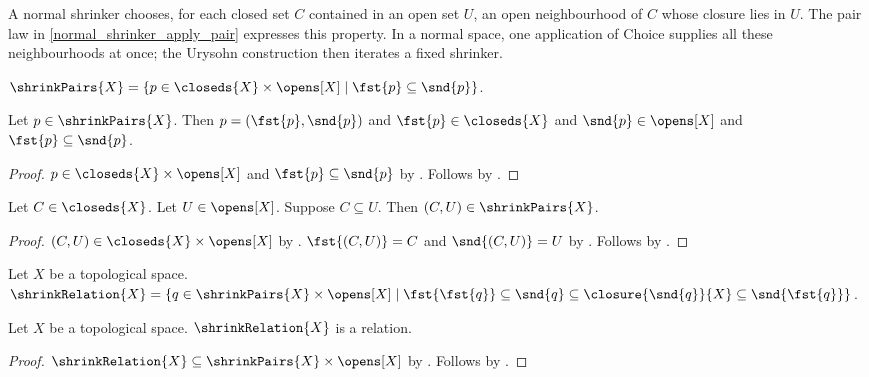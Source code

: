 A normal shrinker chooses, for each closed set $C$ contained in an open set
$U$, an open neighbourhood of $C$ whose closure lies in $U$.
The pair law in \ref{normal_shrinker_apply_pair} expresses this property.
In a normal space, one application of Choice supplies all these neighbourhoods
at once; the Urysohn construction then iterates a fixed shrinker.

\begin{definition}\label{shrink_pairs}
    $\shrinkPairs{X}=\{p\in\closeds{X}\times\opens[X]\mid
        \fst{p}\subseteq\snd{p}\}$.
\end{definition}

\begin{proposition}\label{shrink_pair_elim}
    Let $p\in\shrinkPairs{X}$.
    Then $p=(\fst{p},\snd{p})$ and
        $\fst{p}\in\closeds{X}$ and $\snd{p}\in\opens[X]$ and
        $\fst{p}\subseteq\snd{p}$.
\end{proposition}
\begin{proof}
    $p\in\closeds{X}\times\opens[X]$ and
        $\fst{p}\subseteq\snd{p}$ by .
    Follows by .
\end{proof}

\begin{proposition}\label{shrink_pair_intro}
    Let $C\in\closeds{X}$.
    Let $U\in\opens[X]$.
    Suppose $C\subseteq U$.
    Then $(C,U)\in\shrinkPairs{X}$.
\end{proposition}
\begin{proof}
    $(C,U)\in\closeds{X}\times\opens[X]$
        by .
    $\fst{(C,U)}=C$ and $\snd{(C,U)}=U$ by .
    Follows by .
\end{proof}

\begin{definition}\label{shrink_relation}
    Let $X$ be a topological space.
    $\shrinkRelation{X}=\{q\in\shrinkPairs{X}\times\opens[X]\mid
        \fst{\fst{q}}\subseteq\snd{q}\subseteq
        \closure{\snd{q}}{X}\subseteq\snd{\fst{q}}\}$.
\end{definition}

\begin{proposition}\label{shrink_relation_is_relation}
    Let $X$ be a topological space.
    $\shrinkRelation{X}$ is a relation.
\end{proposition}
\begin{proof}
    $\shrinkRelation{X}\subseteq\shrinkPairs{X}\times\opens[X]$
        by .
    Follows by .
\end{proof}

